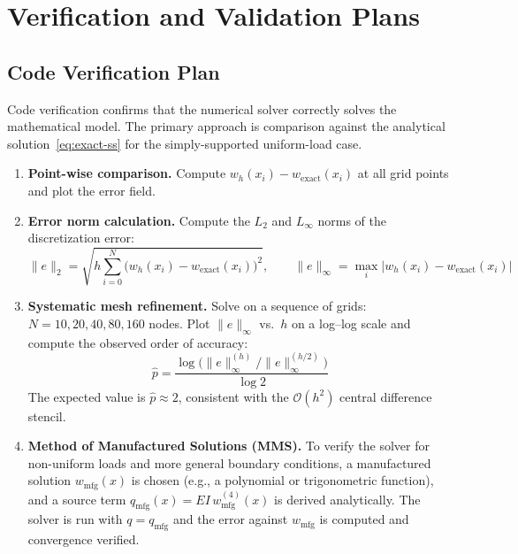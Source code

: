 
\section{Verification and Validation Plans}

\subsection{Code Verification Plan}

Code verification confirms that the numerical solver correctly solves the mathematical model.
The primary approach is comparison against the analytical solution~\eqref{eq:exact-ss} for the simply-supported uniform-load case.

\begin{enumerate}
  \item \textbf{Point-wise comparison.}
  Compute $w_h(x_i) - w_{\text{exact}}(x_i)$ at all grid points and plot the error field.

  \item \textbf{Error norm calculation.}
  Compute the $L_2$ and $L_\infty$ norms of the discretization error:
  \[
    \|e\|_2 = \sqrt{h \sum_{i=0}^{N} \bigl(w_h(x_i) - w_{\text{exact}}(x_i)\bigr)^2},
    \qquad
    \|e\|_\infty = \max_i \bigl|w_h(x_i) - w_{\text{exact}}(x_i)\bigr|
  \]

  \item \textbf{Systematic mesh refinement.}
  Solve on a sequence of grids: $N = 10, 20, 40, 80, 160$ nodes.
  Plot $\|e\|_\infty$ vs.\ $h$ on a log--log scale and compute the observed order of accuracy:
  \[
    \hat{p} = \frac{\log\!\bigl(\|e\|_\infty^{(h)} / \|e\|_\infty^{(h/2)}\bigr)}{\log 2}
  \]
  The expected value is $\hat{p} \approx 2$, consistent with the $\mathcal{O}(h^2)$ central difference stencil.

  \item \textbf{Method of Manufactured Solutions (MMS).}
  To verify the solver for non-uniform loads and more general boundary conditions, a manufactured solution $w_{\text{mfg}}(x)$ is chosen (e.g., a polynomial or trigonometric function), and a source term $q_{\text{mfg}}(x) = EI\,w_{\text{mfg}}^{(4)}(x)$ is derived analytically.
  The solver is run with $q = q_{\text{mfg}}$ and the error against $w_{\text{mfg}}$ is computed and convergence verified.
\end{enumerate}

